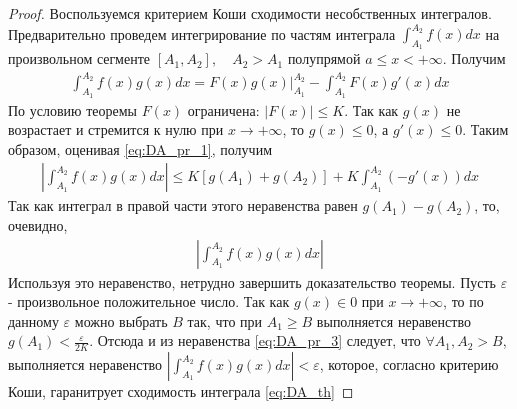 \documentclass[10pt]{article}
\begin{document}
    \begin{proof}
        Воспользуемся критерием Коши сходимости несобственных интегралов. Предварительно проведем интегрирование по частям интеграла $\int_{A_1}^{A_2} f(x) dx$ на произвольном сегменте $[A_1, A_2],\quad A_2>A_1$ полупрямой $a \leq x < +\infty$. Получим
        \begin{gather}
            \int_{A_1}^{A_2} f(x)g(x)dx = F(x)g(x)|^{A_2}_{A_1} - \int_{A_1}^{A_2}F(x)g'(x)dx \label{eq:DA_pr_1}
        \end{gather}
        По условию теоремы $F(x)$ ограничена: $|F(x)| \leq K$. Так как $g(x)$ не возрастает и стремится к нулю при $x \to +\infty$, то $g(x) \leq 0$, а $g'(x) \leq 0$. Таким образом, оценивая \ref{eq:DA_pr_1}, получим
        \begin{gather*}
            \left| \int_{A_1}^{A_2} f(x)g(x)dx \right| \leq K[g(A_1) + g(A_2)] + K \int_{A_1}^{A_2}(-g'(x))dx
        \end{gather*}
        Так как интеграл в правой части этого неравенства равен $g(A_1) - g(A_2)$, то, очевидно,
        \begin{gather}
            \left| \int_{A_1}^{A_2} f(x)g(x) dx \right| \label{eq:DA_pr_3}
        \end{gather}
        Используя это неравенство, нетрудно завершить доказательство теоремы. Пусть $\varepsilon$ - произвольное положительное число. Так как $g(x) \in 0$ при $x \to +\infty$, то по данному $\varepsilon$ можно выбрать $B$ так, что при $A_1 \geq B$ выполняется неравенство $g(A_1) < \frac{\varepsilon}{2K}$. Отсюда и из неравенства \ref{eq:DA_pr_3} следует, что $\forall A_1, A_2 > B$, выполняется неравенство $\left| \int_{A_1}^{A_2} f(x)g(x)dx \right| < \varepsilon$, которое, согласно критерию Коши, гаранитрует сходимость интеграла \ref{eq:DA_th}
    \end{proof}
\end{document}
